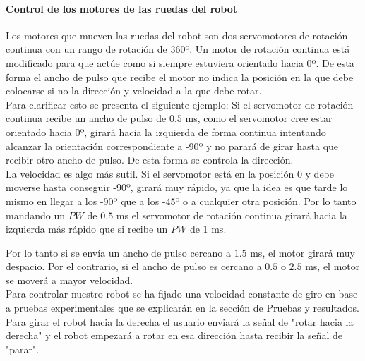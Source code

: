 \documentclass[twoside, 11pt]{epstfg}
\begin{document}
\paragraph{Control de los motores de las ruedas del robot} \label{velMotores}

Los motores que mueven las ruedas del robot son dos servomotores de rotación continua con un rango de rotación de 360º. Un motor de rotación continua está modificado para que actúe como si siempre estuviera orientado hacia 0º. De esta forma el ancho de pulso que recibe el motor no indica la posición en la que debe colocarse si no la dirección y velocidad a la que debe rotar.\\ Para clarificar esto se presenta el siguiente ejemplo: Si el servomotor de rotación continua recibe un ancho de pulso de $0.5$ ms, como el servomotor cree estar orientado hacia 0º, girará hacia la izquierda de forma continua intentando alcanzar la orientación correspondiente a -90º y no parará de girar hasta que recibir otro ancho de pulso. De esta forma se controla la dirección.\\
La velocidad es algo más sutil. Si el servomotor está en la posición 0 y debe moverse hasta conseguir -90º, girará muy rápido, ya que la idea es que tarde lo mismo en llegar a los -90º que a los -45º o a cualquier otra posición. Por lo tanto mandando un $PW$ de $0.5$ ms el servomotor de rotación continua girará hacia la izquierda más rápido que si recibe un $PW$ de $1$ ms.

Por lo tanto si se envía un ancho de pulso cercano a $1.5$ ms, el motor girará muy despacio. Por el contrario, si el ancho de pulso es cercano a $0.5$ o $2.5$ ms, el motor se moverá a mayor velocidad.\\
Para controlar nuestro robot se ha fijado una velocidad constante de giro en base a pruebas experimentales que se explicarán en la sección de Pruebas y resultados.\\
Para girar el robot hacia la derecha el usuario enviará la señal de "rotar hacia la derecha" y el robot empezará a rotar en esa dirección hasta recibir la señal de "parar".

%
%
%
\end{document}
